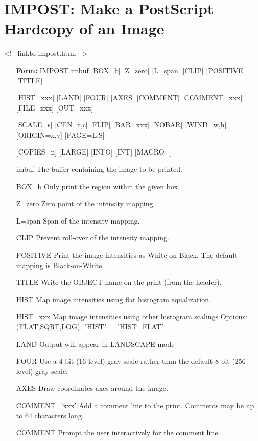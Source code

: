 \section{IMPOST: Make a PostScript Hardcopy of an Image}
\begin{rawhtml}
<!-- linkto impost.html -->
\end{rawhtml}
\begin{itemize}
  \item[\textbf{Form: } IMPOST imbuf {[BOX=b]} {[Z=zero]} {[L=span]} {[CLIP]} 
       {[POSITIVE]} {[TITLE]}\hfill]{}
  \item[{[HIST=xxx]} {[LAND]} {[FOUR]} {[AXES]} {[COMMENT]} {[COMMENT=xxx]}
        {[FILE=xxx]} {[OUT=xxx]}]{}
  \item[{[SCALE=s]} {[CEN=r,c]} {[FLIP]} {[BAR=xxx]} {[NOBAR]} {[WIND=w,h]} 
        {[ORIGIN=x,y]} {[PAGE=L,S]}]{}
  \item[{[COPIES=n]} {[LARGE]} {[INFO]} {[INT]} {[MACRO=]}]{}
  \item[imbuf]{The buffer containing the image to be printed.}
  \item[BOX=b]{Only print the region within the given box.}
  \item[Z=zero ]{Zero point of the intensity mapping.}
  \item[L=span ]{Span of the intensity mapping.  }
  \item[CLIP]{Prevent roll-over of the intensity mapping.}
  \item[POSITIVE ]{Print the image intensities as White-on-Black.
                   The default mapping is Black-on-White.}
  \item[TITLE ]{Write the OBJECT name on the print (from the header).}
  \item[HIST ]{Map image intensities using flat histogram equalization.}
  \item[HIST=xxx]{Map image intensities using other histogram scalings
                  Options: (FLAT,SQRT,LOG).  "HIST" = "HIST=FLAT"}
  \item[LAND ]{Output will appear in LANDSCAPE mode}
  \item[FOUR ]{Use a 4 bit (16 level) gray scale rather than the
               default 8 bit (256 level) gray scale.}
  \item[AXES ]{Draw coordinates axes around the image.}
  \item[COMMENT='xxx']{Add a comment line to the print.  Comments may be
                       up to 64 characters long. }
  \item[COMMENT ]{Prompt the user interactively for the comment line.}

\end{itemize}
